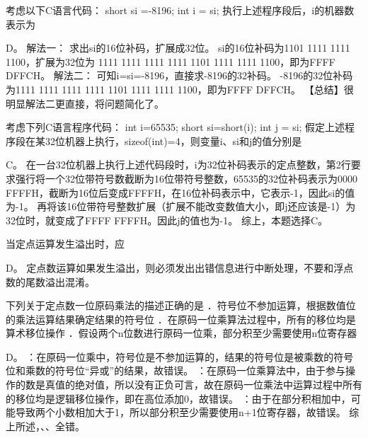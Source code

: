 \question 考虑以下C语言代码： short si =-8196; int i = si;
执行上述程序段后，i的机器数表示为
\par{}
\begin{solution}D。 解法一： 求出si的16位补码，扩展成32位。 si的16位补码为1101 1111 1111
1100，扩展为32位为 1111 1111 1111 1111 1101 1111 1111 1100，即为FFFF
DFFCH。 解法二： 可知i=si=-8196，直接求-8196的32补码。
-8196的32位补码为1111 1111 1111 1111 1101 1111 1111 1100，即为FFFF
DFFCH。 【总结】很明显解法二更直接，将问题简化了。
\end{solution}
\question 考虑下列C语言程序代码： int i=65535; short si=short(i); int j = si;
假定上述程序段在某32位机器上执行，sizeof(int)=4，则变量i、si和j的值分别是
\par{}
\begin{solution}C。
在一台32位机器上执行上述代码段时，i为32位补码表示的定点整数，第2行要求强行将一个32位带符号数截断为16位带符号整数，65535的32位补码表示为0000
FFFFH，截断为16位后变成FFFFH，在16位补码表示中，它表示-1，因此si的值为-1。
再将该16位带符号整数扩展（扩展不能改变数值大小，即j还应该是-1）为32位时，就变成了FFFF
FFFFH。因此j的值也为-1。 综上，本题选择C。
\end{solution}
\question 当定点运算发生溢出时，应
\par{}
\begin{solution}D。
定点数运算如果发生溢出，则必须发出出错信息进行中断处理，不要和浮点数的尾数溢出混淆。
\end{solution}
\question 下列关于定点数一位原码乘法的描述正确的是
．符号位不参加运算，根据数值位的乘法运算结果确定结果的符号位
．在原码一位乘算法过程中，所有的移位均是算术移位操作
．假设两个n位数进行原码一位乘，部分积至少需要使用n位寄存器
\par{}
\begin{solution}D。
：在原码一位乘中，符号位是不参加运算的，结果的符号位是被乘数的符号位和乘数的符号位``异或''的结果，故错误。
：在原码一位乘算法中，由于参与操作的数是真值的绝对值，所以没有正负可言，故在原码一位乘法中运算过程中所有的移位均是逻辑移位操作，即在高位添加0，故错误。
：由于在部分积相加中，可能导致两个小数相加大于1，所以部分积至少需要使用n+1位寄存器，故错误。
综上所述，、、全错。
\end{solution}
